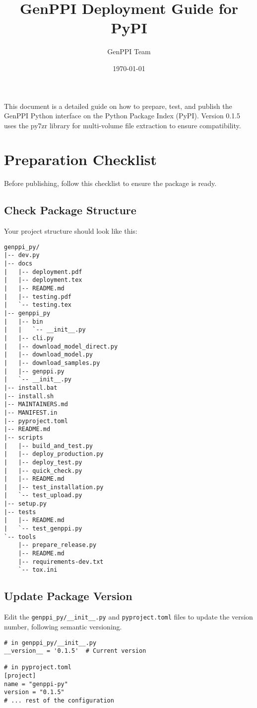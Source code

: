 \documentclass[11pt, a4paper]{article}
\title{\bfseries GenPPI Deployment Guide for PyPI}
\author{GenPPI Team}
\date{\today}
\begin{document}
\maketitle

This document is a detailed guide on how to prepare, test, and publish the GenPPI Python interface on the Python Package Index (PyPI). Version 0.1.5 uses the py7zr library for multi-volume file extraction to ensure compatibility.

\section{Preparation Checklist}

Before publishing, follow this checklist to ensure the package is ready.

\subsection{Check Package Structure}
Your project structure should look like this:
\begin{verbatim}
genppi_py/
|-- dev.py
|-- docs
|   |-- deployment.pdf
|   |-- deployment.tex
|   |-- README.md
|   |-- testing.pdf
|   `-- testing.tex
|-- genppi_py
|   |-- bin
|   |   `-- __init__.py
|   |-- cli.py
|   |-- download_model_direct.py
|   |-- download_model.py
|   |-- download_samples.py
|   |-- genppi.py
|   `-- __init__.py
|-- install.bat
|-- install.sh
|-- MAINTAINERS.md
|-- MANIFEST.in
|-- pyproject.toml
|-- README.md
|-- scripts
|   |-- build_and_test.py
|   |-- deploy_production.py
|   |-- deploy_test.py
|   |-- quick_check.py
|   |-- README.md
|   |-- test_installation.py
|   `-- test_upload.py
|-- setup.py
|-- tests
|   |-- README.md
|   `-- test_genppi.py
`-- tools
    |-- prepare_release.py
    |-- README.md
    |-- requirements-dev.txt
    `-- tox.ini
\end{verbatim}

\subsection{Update Package Version}
Edit the \texttt{genppi\_py/\_\_init\_\_.py} and \texttt{pyproject.toml} files to update the version number, following semantic versioning.
\begin{lstlisting}[style=pythonstyle]
# in genppi_py/__init__.py
__version__ = '0.1.5'  # Current version

# in pyproject.toml
[project]
name = "genppi-py"
version = "0.1.5"
# ... rest of the configuration
\end{lstlisting}
\end{document}
